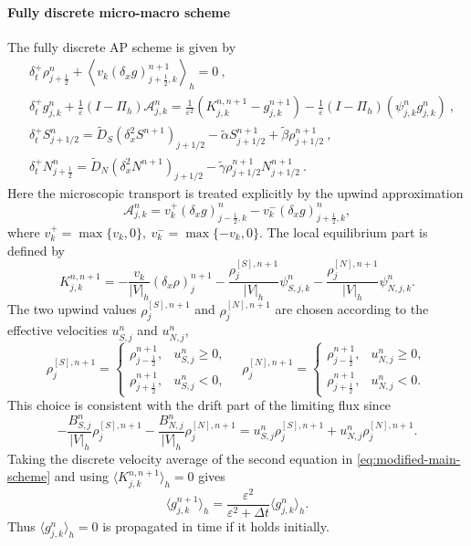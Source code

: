 \documentclass[11pt,twoside]{article}
\numberwithin{equation}{section}
\theoremstyle{plain}
\theoremstyle{nonumberplain}
\begin{document}
{\paragraph{Fully discrete micro-macro scheme}
The fully discrete AP scheme is given by
\begin{subequations}\label{eq:modified-main-scheme}
\begin{align}
&
\delta_t^+\rho_{j+\frac12}^n
+
\left\langle
v_k(\delta_x g)_{j+\frac12,k}^{n+1}
\right\rangle_h
=0\ ,\label{eq:modified-main-scheme1}
\\[1mm]
&
\delta_t^+ g_{j,k}^n
+
\frac1\varepsilon
(I-\Pi_h)\mathcal A_{j,k}^n
=
\frac1{\varepsilon^2}
\left(
K_{j,k}^{n,n+1}
-
g_{j,k}^{n+1}
\right)
-
\frac1\varepsilon
(I-\Pi_h)(\psi_{j,k}^n g_{j,k}^n)\ ,\label{eq:modified-main-scheme2}
\\[1mm]
&
\delta_t^+ S_{j+1/2}^n
=
\widetilde D_S(\delta_x^2S^{n+1})_{j+1/2}
-\widetilde\alpha S_{j+1/2}^{n+1}
+\widetilde\beta\rho_{j+1/2}^{n+1}\ ,\label{eq:modified-main-scheme3}
\\[1mm]
&
\delta_t^+N_{j+\frac12}^{n}
=
\widetilde D_N(\delta_x^2N^{n+1})_{j+1/2}
-\widetilde\gamma\rho_{j+1/2}^{n+1}N_{j+1/2}^{n+1}\ .\label{eq:modified-main-scheme4}
\end{align}
\end{subequations}
Here the microscopic transport is treated explicitly by the upwind
approximation
\[
\mathcal A_{j,k}^n
=
v_k^+(\delta_x g)_{j-\frac12,k}^{n}
-
v_k^-(\delta_x g)_{j+\frac12,k}^{n},
\]
where
$
v_k^+=\max\{v_k,0\},
\
v_k^-=\max\{-v_k,0\}.
$
The local equilibrium part is defined by
\begin{equation}\label{eq:modified-K-two-upwind}
K_{j,k}^{n,n+1}
=
-\frac{v_k}{|V|_h}(\delta_x\rho)_j^{n+1}
-
\frac{\rho_j^{[S],n+1}}{|V|_h}\psi_{S,j,k}^n
-
\frac{\rho_j^{[N],n+1}}{|V|_h}\psi_{N,j,k}^n .
\end{equation}
The two upwind values $\rho_j^{[S],n+1}$ and $\rho_j^{[N],n+1}$ are chosen according to the effective velocities
\(u_{S,j}^n\) and \(u_{N,j}^n\),
\begin{equation}\label{eq: upwind densities}
\rho_j^{[S],n+1}
=
\begin{cases}
\rho_{j-\frac12}^{n+1}, & u_{S,j}^n\ge 0,\\
\rho_{j+\frac12}^{n+1}, & u_{S,j}^n<0,
\end{cases}
\quad 
\rho_j^{[N],n+1}
=
\begin{cases}
\rho_{j-\frac12}^{n+1}, & u_{N,j}^n\ge 0,\\
\rho_{j+\frac12}^{n+1}, & u_{N,j}^n<0.
\end{cases}
\end{equation}
This choice is consistent with the drift part of the limiting flux since
\[
-\frac{B_{S,j}^n}{|V|_h}\rho_j^{[S],n+1}
-
\frac{B_{N,j}^n}{|V|_h}\rho_j^{[N],n+1}
=
u_{S,j}^n\rho_j^{[S],n+1}
+
u_{N,j}^n\rho_j^{[N],n+1}.
\]
Taking the
discrete velocity average of the second equation in
\eqref{eq:modified-main-scheme} and using
$
\langle K_{j,k}^{n,n+1}\rangle_h=0
$
gives
\[
\langle g_{j,k}^{n+1}\rangle_h
=
\frac{\varepsilon^2}{\varepsilon^2+\Delta t}
\langle g_{j,k}^{n}\rangle_h .
\]
Thus \(\langle g_{j,k}^{n}\rangle_h=0\) is propagated in time if it holds
initially.

}
\end{document}
